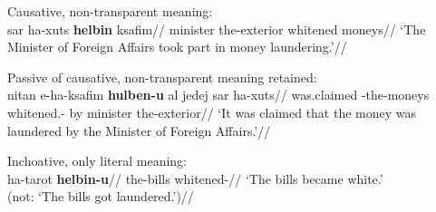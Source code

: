	\a Causative, non-transparent meaning:\\
		\begingl
			\gla sar ha-xuts \textbf{helbin} ksafim//
			\glb minister the-exterior whitened moneys//
			\glft `The Minister of Foreign Affairs took part in money laundering.'//
		\endgl
	
	\a Passive of causative, non-transparent meaning retained:\\
		\begingl
			\gla nitan e-ha-ksafim \textbf{hulben-u} {al jedej} sar ha-xuts//
			\glb was.claimed -the-moneys whitened.- by minister the-exterior//
			\glft `It was claimed that the money was laundered by the Minister of Foreign Affairs.'//
		\endgl
	
	\a Inchoative, only literal meaning:\\
		\begingl
			\gla ha-tarot \textbf{helbin-u}//
			\glb the-bills whitened-//
			\glft `The bills became white.'\\
				(not: `The bills got laundered.')//
		\endgl
\xe


%	



